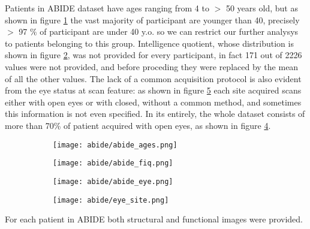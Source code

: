 \documentclass[a4paper,11pt]{article}
\begin{document}
Patients in ABIDE dataset have ages ranging from 4 to $>$ 50 years old, but as shown in figure \ref{fig:abideages} the vast majority of participant are younger than 40, precisely $>$ 97 $\%$ of participant are under 40 y.o. so we can restrict our further analysys to patients belonging to this group.
Intelligence quotient, whose distribution is shown in figure \ref{fig:abidefiq}, was not provided for every participant, in fact 171 out of 2226 values were not provided, and before proceding they were replaced by the mean of all the other values.
The lack of a common acquisition protocol is also evident from the eye status at scan feature: as shown in figure \ref{fig:abideeyesite} each site acquired scans either with open eyes or with closed, without a common method, and sometimes this information is not even specified.
In its entirely, the whole dataset consists of more than 70\% of patient acquired with open eyes, as shown in figure \ref{fig:abideeye}.




\begin{figure}
\begin{subfigure}{0.5\textwidth}
\texttt{[image: abide/abide\_ages.png]}
\caption{}
\label{fig:abideages}
\end{subfigure}
\begin{subfigure}{0.5\textwidth}
\texttt{[image: abide/abide\_fiq.png]}
\caption{}
\label{fig:abidefiq}
\end{subfigure}

\caption{}
\label{}
\end{figure}



\begin{figure}
\begin{subfigure}{0.4\linewidth}
\texttt{[image: abide/abide\_eye.png]}
\caption{}
\label{fig:abideeye}
\end{subfigure}
\begin{subfigure}{0.7\linewidth}
\texttt{[image: abide/eye\_site.png]}
\caption{}
\label{fig:abideeyesite}
\end{subfigure}
\hspace{0.1 cm}
\caption{}
\label{}
\end{figure}


For each patient in ABIDE both structural and functional images were provided.
\end{document}
